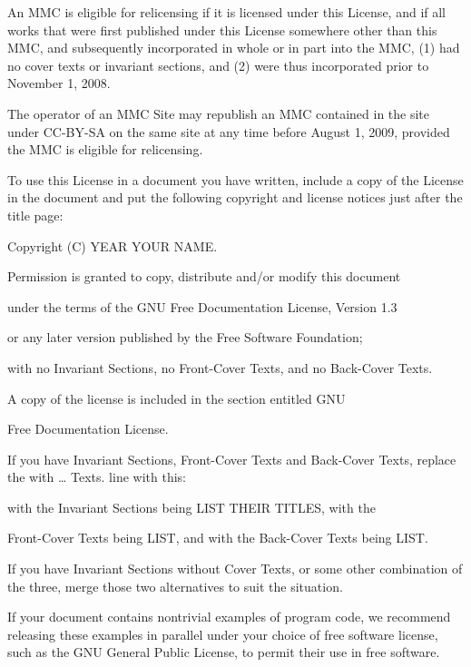 \begin{BookLicense}
An MMC is \BookQuoteChar{}eligible for relicensing\BookQuoteChar{} if it is licensed under this License, and if all works that were first published under this License somewhere other than this MMC, and subsequently incorporated in whole or in part into the MMC, (1) had no cover texts or invariant sections, and (2) were thus incorporated prior to November 1, 2008.

The operator of an MMC Site may republish an MMC contained in the site under CC-BY-SA on the same site at any time before August 1, 2009, provided the MMC is eligible for relicensing.

To use this License in a document you have written, include a copy of the License in the document and put the following copyright and license notices just after the title page:

Copyright (C) YEAR YOUR NAME.

Permission is granted to copy, distribute and/or modify this document

under the terms of the GNU Free Documentation License, Version 1.3

or any later version published by the Free Software Foundation;

with no Invariant Sections, no Front-Cover Texts, and no Back-Cover Texts.

A copy of the license is included in the section entitled \BookQuoteChar{}GNU

Free Documentation License\BookQuoteChar{}.

If you have Invariant Sections, Front-Cover Texts and Back-Cover Texts, replace the \BookQuoteChar{}with … Texts.\BookQuoteChar{} line with this:

with the Invariant Sections being LIST THEIR TITLES, with the

Front-Cover Texts being LIST, and with the Back-Cover Texts being LIST.

If you have Invariant Sections without Cover Texts, or some other combination of the three, merge those two alternatives to suit the situation.

If your document contains nontrivial examples of program code, we recommend releasing these examples in parallel under your choice of free software license, such as the GNU General Public License, to permit their use in free software.

\end{BookLicense}

